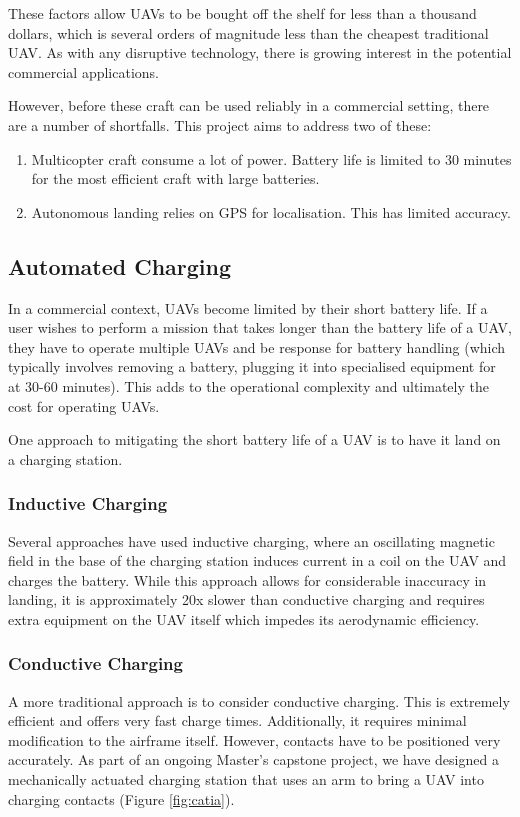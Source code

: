\documentclass[10pt]{scrartcl} %
\begin{document}
These factors allow UAVs to be bought off the shelf for less than a thousand dollars, which is several orders of magnitude less than the cheapest traditional UAV. As with any disruptive technology, there is growing interest in the potential commercial applications. 

However, before these craft can be used reliably in a commercial setting, there are a number of shortfalls. This project aims to address two of these:
\begin{enumerate}
\item{Multicopter craft consume a lot of power. Battery life is limited to 30 minutes for the most efficient craft with large batteries.}
\item{Autonomous landing relies on GPS for localisation. This has limited accuracy.}
\end{enumerate}

\subsection{Automated Charging}

In a commercial context, UAVs become limited by their short battery life. If a user wishes to perform a mission that takes longer than the battery life of a UAV, they have to operate multiple UAVs and be response for battery handling (which typically involves removing a battery, plugging it into specialised equipment for at 30-60 minutes). This adds to the operational complexity and ultimately the cost for operating UAVs.

One approach to mitigating the short battery life of a UAV is to have it land on a charging station. 

\subsubsection{Inductive Charging}
Several approaches have used inductive charging, where an oscillating magnetic field in the base of the charging station induces current in a coil on the UAV and charges the battery. While this approach allows for considerable inaccuracy in landing, it is approximately 20x slower than conductive charging and requires extra equipment on the UAV itself which impedes its aerodynamic efficiency.

\subsubsection{Conductive Charging}
A more traditional approach is to consider conductive charging. This is extremely efficient and offers very fast charge times. Additionally, it requires minimal modification to the airframe itself. However, contacts have to be positioned very accurately. As part of an ongoing Master's capstone project, we have designed a mechanically actuated charging station that uses an arm to bring a UAV into charging contacts (Figure \ref{fig:catia}). 
\end{document}
